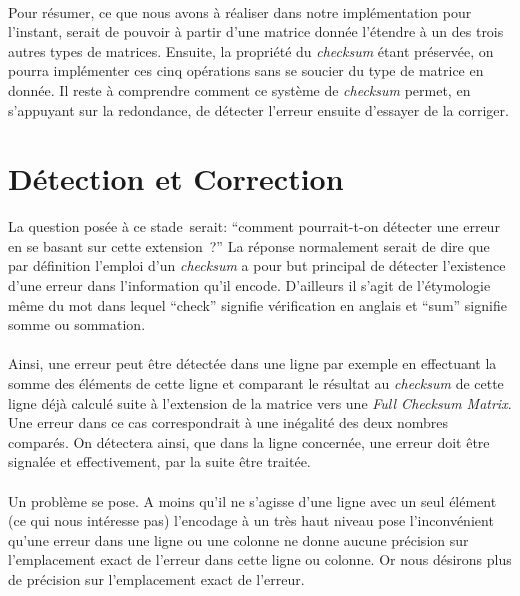 \documentclass[a4paper,10pt]{report}
\begin{document}
\paragraph*{}
Pour résumer, ce que nous avons à réaliser dans notre implémentation pour l’instant, serait de pouvoir à partir 
d’une matrice donnée l’étendre à un des trois autres types de matrices. Ensuite, la propriété du \textit{checksum} 
étant préservée, on pourra implémenter ces cinq opérations sans se soucier du type de matrice en donnée.\newline
Il reste à comprendre comment ce système de \textit{checksum}  permet, en s’appuyant sur la redondance, de détecter 
l’erreur ensuite d’essayer de la corriger.

\section{Détection et Correction}
La question posée à ce stade serait: ``comment pourrait-t-on détecter une erreur en se basant sur cette extension ?''
La réponse normalement serait de dire que par définition l’emploi d’un \textit{checksum} a pour but principal de 
détecter l’existence d’une erreur dans l’information qu’il encode. D’ailleurs il s’agit de l’étymologie même du mot 
dans lequel ``check'' signifie vérification en anglais et ``sum'' signifie somme ou sommation.
\paragraph*{} 
Ainsi, une erreur peut être détectée dans une ligne par exemple en effectuant la somme des éléments de cette ligne 
et comparant le résultat au \textit{checksum} de cette ligne déjà calculé suite à l’extension de la matrice vers 
une \textit{Full Checksum Matrix}. Une erreur dans ce cas correspondrait à une inégalité des deux nombres comparés. 
On détectera ainsi, que dans la ligne concernée, une erreur doit être signalée et effectivement, par la suite être traitée.
\paragraph*{}
Un problème se pose. A moins qu’il ne s’agisse d’une ligne avec un seul élément (ce qui nous intéresse pas) l’encodage 
à un très haut niveau pose l’inconvénient qu’une erreur dans une ligne ou une colonne ne donne aucune précision sur 
l’emplacement exact de l’erreur dans cette ligne ou colonne. Or nous désirons plus de précision sur l’emplacement 
exact de l’erreur.
\end{document}
